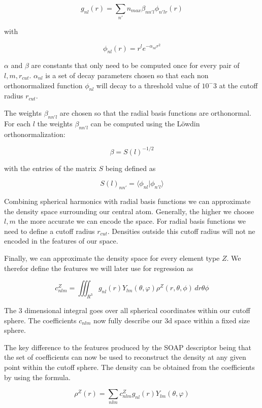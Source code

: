 $$g_{nl}(r) = \sum_{n'}{n_{max}} \beta_{nn'l} \phi_{n'lr}(r) $$

with 

$$\phi_{nl}(r) = r^l e^{-\alpha_{nl}r^2} $$ %

$\alpha$ and $\beta$ are constants that only need to be computed once for every pair of $l,m, r_{cut}$.
$\alpha_{nl}$ is a set of decay parameters chosen so that each non orthonormalized function $\phi_{nl}$ 
will decay to a threshold value of $10^-3$ at the cutoff radius $r_{cut}$.

The weights $\beta_{nn'l}$ are chosen so that the radial basis functions are orthonormal.
For each $l$ the weights $\beta_{nn'l}$ can be computed using the Löwdin orthonormalization:

$$\beta = S(l)^{-1/2} $$

with the entries of the matrix $S$ being defined as

$$S(l)_{nn'} = \langle \phi_{nl} | \phi_{n'l} \rangle  $$

Combining spherical harmonics with radial basis functions we can approximate the density space surrounding our central atom.
Generally, the higher we choose $l, m$ the more accurate we can encode the space.
For radial basis functions we need to define a cutoff radius $r_{cut}$.
Densities outside this cutoff radius will not ne encoded in the features of our space.

Finally, we can approximate the density space for every element type $Z$.
We therefor define the features we will later use for regression as

$$ c_{nlm}^Z = \iiint_{R^3} g_{nl}(r) Y_{lm}(\theta, \varphi) \rho^Z(r, \theta, \phi)  \,dr\theta\phi   $$

The 3 dimensional integral goes over all spherical coordinates within our cutoff sphere.
The coefficients $c_{nlm}$ now fully describe our 3d space within a fixed size sphere.

The key difference to the features produced by the SOAP descriptor being that the set of coefficients 
can now be used to reconstruct the density at any given point within the cutoff sphere.
The density can be obtained from the coefficients by using the formula.

$$ \rho^Z(r) = \sum_{nlm} c^Z_{nlm} g_{nl}(r) Y_{lm}(\theta, \varphi) $$
